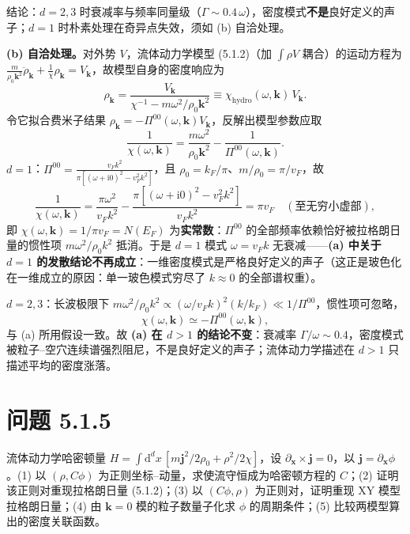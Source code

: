 结论：$d=2,3$ 时衰减率与频率同量级（$\Gamma\sim0.4\,\omega$），密度模式\textbf{不是}良好定义的声子；$d=1$ 时朴素处理在奇异点失效，须如 (b) 自洽处理。

\textbf{(b) 自洽处理。}对外势 $V$，流体动力学模型 (5.1.2)（加 $\int\rho V$ 耦合）的运动方程为 $\frac{m}{\rho_0\pmb{k}^{2}}\ddot{\rho}_{\pmb{k}}+\frac{1}{\chi}\rho_{\pmb{k}}=V_{\pmb{k}}$，故模型自身的密度响应为
\begin{equation*}
\rho_{\pmb{k}}=\frac{V_{\pmb{k}}}{\chi^{-1}-m\omega^{2}/\rho_0\pmb{k}^{2}}
\equiv \chi_{\mathrm{hydro}}(\omega,\pmb{k})\,V_{\pmb{k}} .
\end{equation*}
令它拟合费米子结果 $\rho_{\pmb{k}}=-\Pi^{00}(\omega,\pmb{k})V_{\pmb{k}}$，反解出模型参数应取
\begin{equation*}
\frac{1}{\chi(\omega,\pmb{k})}=\frac{m\omega^{2}}{\rho_0\pmb{k}^{2}}-\frac{1}{\Pi^{00}(\omega,\pmb{k})} .
\end{equation*}
$d=1$：$\Pi^{00}=\frac{v_Fk^{2}}{\pi[(\omega+\mathrm{i}0)^{2}-v_F^{2}k^{2}]}$，且 $\rho_0=k_F/\pi$、$m/\rho_0=\pi/v_F$，故
\begin{equation*}
\frac{1}{\chi(\omega,\pmb{k})}
=\frac{\pi\omega^{2}}{v_Fk^{2}}-\frac{\pi[(\omega+\mathrm{i}0)^{2}-v_F^{2}k^{2}]}{v_Fk^{2}}
=\pi v_F\quad(\text{至无穷小虚部}),
\end{equation*}
即 $\chi(\omega,\pmb{k})=1/\pi v_F=N(E_F)$ 为\textbf{实常数}：$\Pi^{00}$ 的全部频率依赖恰好被拉格朗日量的惯性项 $m\omega^{2}/\rho_0k^{2}$ 抵消。于是 $d=1$ 模式 $\omega=v_Fk$ 无衰减——\textbf{(a) 中关于 $d=1$ 的发散结论不再成立}：一维密度模式是严格良好定义的声子（这正是玻色化在一维成立的原因：单一玻色模式穷尽了 $k\approx0$ 的全部谱权重）。

$d=2,3$：长波极限下 $m\omega^{2}/\rho_0k^{2}\propto(\omega/v_Fk)^{2}(k/k_F)\ll1/\Pi^{00}$，惯性项可忽略，
\begin{equation*}
\chi(\omega,\pmb{k})\simeq-\Pi^{00}(\omega,\pmb{k}),
\end{equation*}
与 (a) 所用假设一致。故 \textbf{(a) 在 $d>1$ 的结论不变}：衰减率 $\Gamma/\omega\sim0.4$，密度模式被粒子--空穴连续谱强烈阻尼，不是良好定义的声子；流体动力学描述在 $d>1$ 只描述平均的密度涨落。

\section*{问题 5.1.5}
\begin{problem}
流体动力学哈密顿量 $H=\int\mathrm{d}^dx\,[m\pmb{j}^2/2\rho_0+\rho^2/2\chi]$，设 $\partial_{\pmb{x}}\times\pmb{j}=0$，以 $\pmb{j}=\partial_{\pmb{x}}\phi$。(1) 以 $(\rho,C\phi)$ 为正则坐标--动量，求使流守恒成为哈密顿方程的 $C$；(2) 证明该正则对重现拉格朗日量 (5.1.2)；(3) 以 $(C\phi,\rho)$ 为正则对，证明重现 XY 模型拉格朗日量；(4) 由 $\pmb{k}=0$ 模的粒子数量子化求 $\phi$ 的周期条件；(5) 比较两模型算出的密度关联函数。
\end{problem}
\solution

